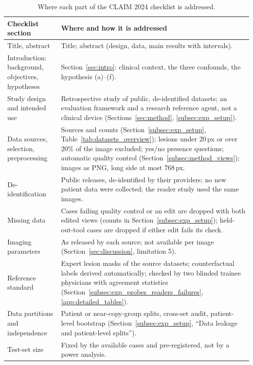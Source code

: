 \documentclass[5p,times,twocolumn,authoryear]{elsarticle}
\begin{document}
\begin{table}[!htbp]
\caption{Where each part of the CLAIM 2024 checklist is addressed.}
\label{tab:claim}
\begin{center}
\small
\begin{adjustbox}{max width=\linewidth}
\begin{tabular}{L{3.6cm}L{9.6cm}}
\toprule
\textbf{Checklist section} & \textbf{Where and how it is addressed} \\
\midrule
Title, abstract & Title; abstract (design, data, main results with intervals). \\
Introduction: background, objectives, hypotheses & Section~\ref{sec:intro}: clinical context, the three confounds, the hypothesis (a)--(f). \\
Study design and intended use & Retrospective study of public, de-identified datasets; an evaluation framework and a research reference agent, not a clinical device (Sections~\ref{sec:method}, \ref{subsec:exp_setup}). \\
Data sources, selection, preprocessing & Sources and counts (Section~\ref{subsec:exp_setup}, Table~\ref{tab:datasets_overview}); lesions under 20\,px or over $20\%$ of the image excluded; yes/no presence questions; automatic quality control (Section~\ref{subsec:method_views}); images as PNG, long side at most 768\,px. \\
De-identification & Public releases, de-identified by their providers; no new patient data were collected; the reader study used the same images. \\
Missing data & Cases failing quality control or an edit are dropped with both edited views (counts in Section~\ref{subsec:exp_setup}); held-out-tool cases are dropped if either edit fails its check. \\
Imaging parameters & As released by each source; not available per image (Section~\ref{sec:discussion}, limitation 5). \\
Reference standard & Expert lesion masks of the source datasets; counterfactual labels derived automatically; checked by two blinded trainee physicians with agreement statistics (Section~\ref{subsec:exp_probes_readers_failures}, \ref{app:detailed_tables}). \\
Data partitions and independence & Patient or near-copy-group splits, cross-set audit, patient-level bootstrap (Section~\ref{subsec:exp_setup}, ``Data leakage and patient-level splits''). \\
Test-set size & Fixed by the available cases and pre-registered, not by a power analysis. \\

\end{tabular}
\end{adjustbox}
\end{center}
\end{table}
\end{document}
